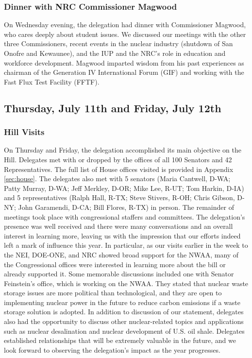 \subsubsection*{Dinner with NRC Commissioner Magwood}

On Wednesday evening, the delegation had dinner with Commissioner Magwood, who
cares deeply about student issues. We discussed our meetings with the other
three Commissioners, recent events in the nuclear industry (shutdown of San
Onofre and Kewaunee), and the IUP and the NRC's role in education and workforce
development. Magwood imparted wisdom from his past experiences as chairman of
the Generation IV International Forum (GIF) and working with the Fast Flux Test
Facility (FFTF).

\subsection*{Thursday, July 11th and Friday, July 12th}

\subsubsection*{Hill Visits}

On Thursday and Friday, the delegation accomplished its main objective on the
Hill. Delegates met with or dropped by the offices of all 100 Senators and 42
Representatives. The full list of House offices visited is provided in Appendix
\ref{sec:house}. The delegates also met with 5 senators (Maria Cantwell, D-WA;
Patty Murray, D-WA; Jeff Merkley, D-OR; Mike Lee, R-UT; Tom Harkin, D-IA) and 5
representatives (Ralph Hall, R-TX; Steve Stivers, R-OH; Chris Gibson, D-NY; John
Garamendi, D-CA; Bill Flores, R-TX) in person. The remainder of meetings took
place with congressional staffers and committees. The delegation's presence was
well received and there were many conversations and an overall interest in
learning more, leaving us with the impression that our efforts indeed left a
mark of influence this year. In particular, as our visits earlier in the week to
the NEI, DOE-ONE, and NRC showed broad support for the NWAA, many of the
Congressional offices were interested in learning more about the bill or already
supported it. Some memorable discussions included one with Senator Feinstein's
office, which is working on the NWAA. They stated that nuclear waste storage
issues are more political than technological, and they are open to implementing
nuclear power in the future to reduce carbon emissions if a waste storage
solution is adopted. In addition to discussion of our statement, delegates also
had the opportunity to discuss other nuclear-related topics and applications
such as nuclear desalination and nuclear development of U.S. oil
shale. Delegates established relationships that will be extremely valuable in
the future, and we look forward to observing the delegation's impact as the year
progresses.

